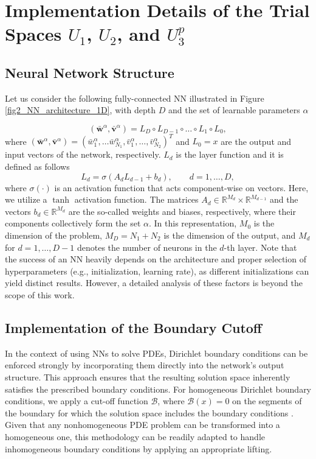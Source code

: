 \documentclass[oneside]{article}
\begin{document}
\section{Implementation Details of the Trial Spaces $U_1$, $U_2$, and $U_3^p$}\label{Implementation Details of the Trial Spaces}


\subsection{Neural Network Structure}\label{Neural Network Structure}
Let us consider the following fully-connected NN illustrated in Figure \ref{fig2_NN_architecture_1D}, with depth $D$ and the set of learnable parameters $\alpha$

\begin{equation}\label{eq2_NN_before ReCoNN}
(\bar{\mathbf{w}}^\alpha, \bar{\mathbf{v}}^\alpha) = L_{D} \circ L_{D - 1} \circ \ldots  \circ  L_1 \circ L_0, 
\end{equation}
where $(\bar{\mathbf{w}}^\alpha, \bar{\mathbf{v}}^\alpha) = (\bar{w}^\alpha_1, \ldots \bar{w}^\alpha_{N_1},\bar{v}^\alpha_1, \ldots, \bar{v}^\alpha_{N_2})^T$ and $L_0 = x$ are the output and input vectors of the network, respectively. $L_d$ is the layer function and it is defined as follows
\begin{equation}\label{eq_layers}
L_d =\sigma( A_d L_{d-1} + b_d), \qquad d = 1, \ldots, D, 
\end{equation}
where $\sigma(\cdot)$ is an activation function that acts component-wise on vectors. Here, we utilize a $\tanh$ activation function. The matrices $A_d\in\mathbb R^{M_d} \times \mathbb R^{M_{d-1}}$ and the vectors $b_d\in\mathbb{R}^{M_{d}}$ are the so-called weights and biases, respectively, where their components collectively form the set $\alpha$. In this representation, $M_0$ is the dimension of the problem, $M_{D} = N_1 + N_2$ is the dimension of the output, and $M_{d}$ for $ d =1, \ldots, D-1$ denotes the number of neurons in the $d$-th layer. Note that the success of an NN heavily depends on the architecture and proper selection of hyperparameters (e.g., initialization, learning rate), as different initializations can yield distinct results. However, a detailed analysis of these factors is beyond the scope of this work.

\subsection{Implementation of the Boundary Cutoff}\label{Boundary Cutoff Function}
In the context of using NNs to solve PDEs, Dirichlet boundary conditions can be enforced strongly by incorporating them directly into the network’s output structure. This approach ensures that the resulting solution space inherently satisfies the prescribed boundary conditions. For homogeneous {Dirichlet} boundary conditions, we apply a cut-off function $\mathcal{B}$, where $\mathcal{B}(x) = 0$ on the segments of the boundary for which the solution space includes the boundary conditions \cite{berrone2023enforcing}. Given that any nonhomogeneous PDE problem can be transformed into a homogeneous one, this methodology can be readily adapted to handle inhomogeneous boundary conditions by applying an appropriate lifting. 
\end{document}
